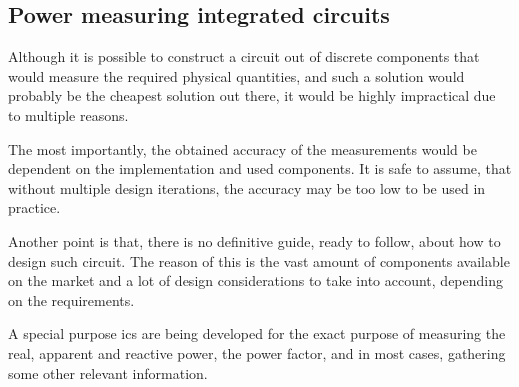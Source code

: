 \documentclass[journal]{IEEEtran}
\begin{document}
%
%


\subsection{Power measuring integrated circuits} \label{ss:pmic}

Although it is possible to construct a circuit out of discrete components that would measure \cite{webster2003electrical} the required physical quantities, and such a solution would probably be the cheapest solution out there, it would be highly impractical due to multiple reasons.

The most importantly, the obtained accuracy of the measurements would be dependent on the implementation and used components. It is safe to assume, that without multiple design iterations, the accuracy may be too low to be used in practice.

Another point is that, there is no definitive guide, ready to follow, about how to design such circuit. The reason of this is the vast amount of components available on the market and a lot of design considerations to take into account, depending on the requirements.

A special purpose \glspl{ic} are being developed for the exact purpose of measuring the real, apparent and reactive power, the power factor, and in most cases, gathering some other relevant information.
\end{document}
